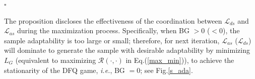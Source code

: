 \hfill $\square$

The proposition discloses the effectiveness of the coordination between $\mathcal{L}_{ds}$ and $\mathcal{L}_{as}$ during the maximization process. Specifically, when BG $>0$ ($< 0$), the sample adaptability is too large or small; therefore, for next iteration, $\mathcal{L}_{as}$ ($\mathcal{L}_{ds}$) will dominate to generate the sample with desirable adaptability by minimizing $L_G$ (equivalent to maximizing $\mathcal{R}(\cdot,\cdot)$  in Eq.(\ref{max_min})), to achieve the stationarity of the DFQ game, \emph{i.e.}, BG $=0$; see Fig.\ref{s_ada}.

























